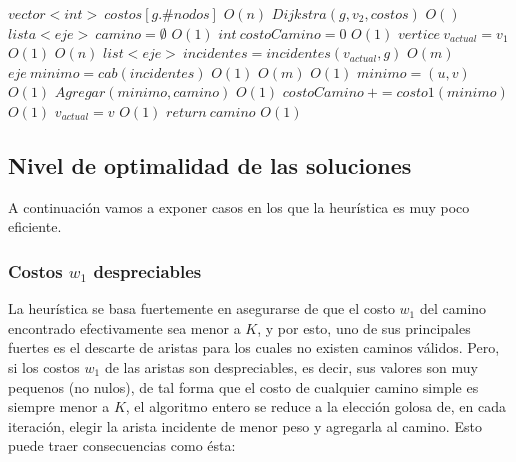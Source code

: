 \begin{algorithmic}


\State $vector<int> \: costos[g.\#nodos]$
\Comment $ O(n) $
\State $ Dijkstra( g, v_2, costos) $
\Comment $ O() $
\State $lista<eje> \: camino= \emptyset$
\Comment $ O(1) $
\State $ int \: costoCamino = 0 $
\Comment $ O(1) $
\State $ vertice \: v_{actual} = v_1 $
\Comment $ O(1) $
\Comment $ O(n) $
	\State $ list<eje> \: incidentes = incidentes(v_{actual}, g) $
	\Comment $ O(m) $
	\State $ eje \:	 minimo = cab(incidentes) $
	\Comment $ O(1)$
	\Comment $ O(m) $
		\Comment $ O(1) $
			\State $ minimo = (u,v) $
			\Comment $ O(1) $
		\EndIf
	\EndFor
	\State $ Agregar(minimo, camino) $
	\Comment $ O(1) $
	\State $ costoCamino \: += costo1(minimo) $
	\Comment $ O(1) $
	\State $ v_{actual} = v $
	\Comment $ O(1) $
\EndWhile
\State $ return \: camino $
\Comment $ O(1) $

\EndProcedure

\end{algorithmic}


\subsection{Nivel de optimalidad de las soluciones}

A continuaci\'on vamos a exponer casos en los que la heur\'istica es muy poco eficiente.
\subsubsection{Costos $w_1$ despreciables}

La heur\'istica se basa fuertemente en asegurarse de que el costo $w_1$ del camino encontrado efectivamente sea menor a $K$, y por esto, uno de sus principales fuertes es el descarte de aristas para los cuales no existen caminos v\'alidos. Pero, si los costos $w_1$ de las aristas son despreciables, es decir, sus valores son muy pequenos (no nulos), de tal forma que el costo de cualquier camino simple es siempre menor a $K$, el algoritmo entero se reduce a la elecci\'on golosa de, en cada iteraci\'on, elegir la arista incidente de menor peso y agregarla al camino. Esto puede traer consecuencias como \'esta:

